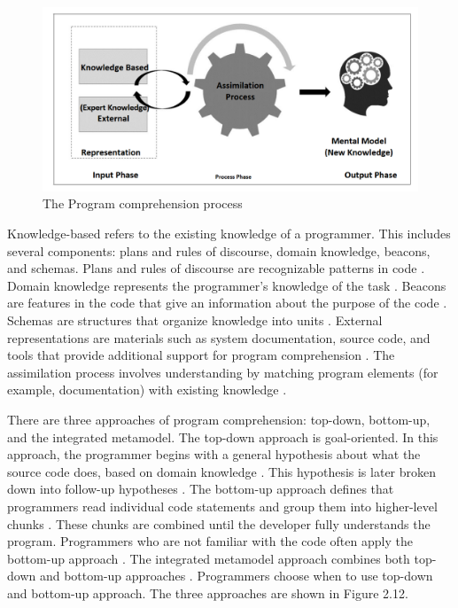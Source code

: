\begin{figure} [H]
  \centering
  \includegraphics[width=\textwidth]{figures/program_Comprehension_Process.png}
  \caption{The Program comprehension process \cite[p. 5]{kadar2021program}}
  \label{fig:AnhangsChor}
\end{figure}




Knowledge-based refers to the existing knowledge of a programmer. This includes several components: plans and rules of discourse, domain knowledge, beacons, and schemas. Plans and rules of discourse are recognizable patterns in code \cite{fekete2020comprehensive}. Domain knowledge represents the programmer’s knowledge of the task \cite{kadar2021program}.
Beacons are features in the code that give an information about the purpose of the code \cite{fekete2020comprehensive}. Schemas are structures that organize knowledge into units \cite{kadar2021program}. External representations are materials such as system documentation, source code, and tools that provide additional support for program comprehension \cite{kadar2021program}. The assimilation process involves understanding by matching program elements (for example, documentation) with existing knowledge \cite{von1995program}. 



There are three approaches of program comprehension:  top-down, bottom-up, and the integrated metamodel. The top-down approach is goal-oriented. In this approach, the programmer begins with a general hypothesis about what the source code does, based on domain knowledge \cite{storey2005theories}. This hypothesis is later broken down into follow-up hypotheses  \cite{fekete2020comprehensive}. The bottom-up approach defines that programmers read individual code statements and group them into higher-level chunks \cite{storey2005theories}. These chunks are combined until the developer fully understands the program.  Programmers who are not familiar with the code often apply the bottom-up approach \cite{kadar2021program}. The integrated metamodel approach combines both top-down and bottom-up approaches \cite{kadar2021program}.  Programmers choose when to use top-down and bottom-up approach.  The three approaches are shown in Figure 2.12.  



